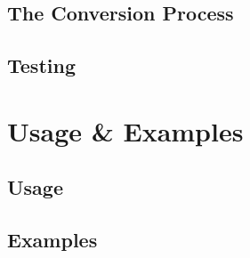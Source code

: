 \subsection{The Conversion Process}
\lipsum[15-17]
\subsection{Testing}
\lipsum[18-20]

\pagebreak
\section{Usage \& Examples}
\lipsum[9-10]
\subsection{Usage}
\lipsum[18-20]
\subsection{Examples}
\lipsum[3-4]